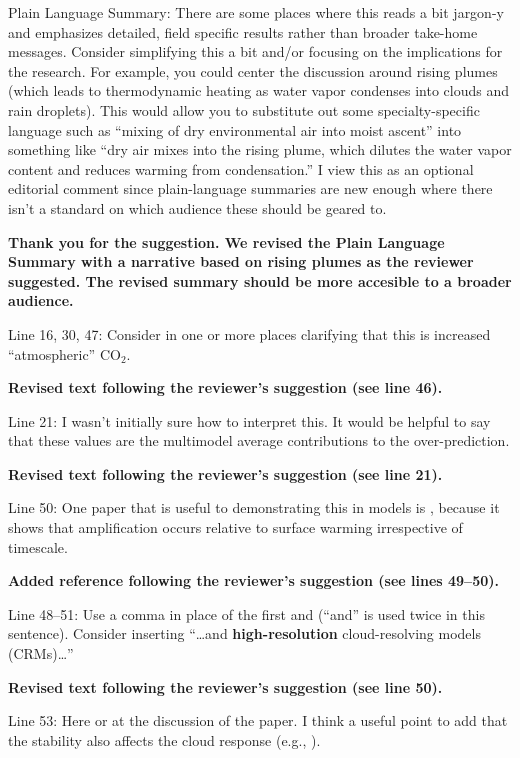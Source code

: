 \documentclass[11pt]{article}
\begin{document}
Plain Language Summary: There are some places where this reads a bit jargon-y and emphasizes detailed, field specific results rather than broader take-home messages. Consider simplifying this a bit and/or focusing on the implications for the research. For example, you could center the discussion around rising plumes (which leads to thermodynamic heating as water vapor condenses into clouds and rain droplets). This would allow you to substitute out some specialty-specific language such as ``mixing of dry environmental air into moist ascent'' into something like ``dry air mixes into the rising plume, which dilutes the water vapor content and reduces warming from condensation.'' I view this as an optional editorial comment since plain-language summaries are new enough where there isn't a standard on which audience these should be geared to.

\textbf{Thank you for the suggestion. We revised the Plain Language Summary with a narrative based on rising plumes as the reviewer suggested. The revised summary should be more accesible to a broader audience.}

Line 16, 30, 47: Consider in one or more places clarifying that this is increased ``atmospheric'' CO\(_2\).

\textbf{Revised text following the reviewer's suggestion (see line 46).}

Line 21: I wasn't initially sure how to interpret this. It would be helpful to say that these values are the multimodel average contributions to the over-prediction.

\textbf{Revised text following the reviewer's suggestion (see line 21).}

Line 50: One paper that is useful to demonstrating this in models is \cite{santer_amplification_2005}, because it shows that amplification occurs relative to surface warming irrespective of timescale.

\textbf{Added reference following the reviewer's suggestion (see lines 49--50).}

Line 48--51: Use a comma in place of the first and (``and'' is used twice in this sentence). Consider inserting ``\ldots{}and \textbf{high-resolution} cloud-resolving models (CRMs)\ldots{}''

\textbf{Revised text following the reviewer's suggestion (see line 50).}

Line 53: Here or at the discussion of the \cite{andrews_dependence_2018} paper. I think a useful point to add that the stability also affects the cloud response (e.g., \cite{zhou_impact_2016}).
\end{document}
